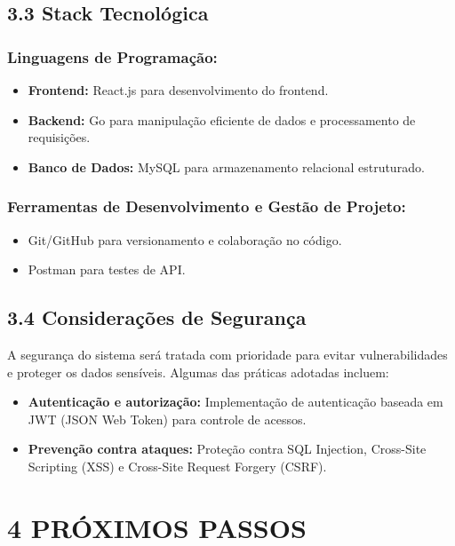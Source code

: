 \documentclass[12pt]{article}
\begin{document}
\subsection*{3.3 Stack Tecnológica}

\subsubsection*{Linguagens de Programação:}
\begin{itemize}
    \item \textbf{Frontend:} React.js para desenvolvimento do frontend.
    \item \textbf{Backend:} Go para manipulação eficiente de dados e processamento de requisições.
    \item \textbf{Banco de Dados:} MySQL para armazenamento relacional estruturado.
\end{itemize}

\subsubsection*{Ferramentas de Desenvolvimento e Gestão de Projeto:}
\begin{itemize}
    \item Git/GitHub para versionamento e colaboração no código.
    \item Postman para testes de API.
\end{itemize}

\subsection*{3.4 Considerações de Segurança}

A segurança do sistema será tratada com prioridade para evitar vulnerabilidades e proteger os dados sensíveis. Algumas das práticas adotadas incluem:
\begin{itemize}
    \item \textbf{Autenticação e autorização:} Implementação de autenticação baseada em JWT (JSON Web Token) para controle de acessos.
    \item \textbf{Prevenção contra ataques:} Proteção contra SQL Injection, Cross-Site Scripting (XSS) e Cross-Site Request Forgery (CSRF).
\end{itemize}

\newpage

\section*{4 PRÓXIMOS PASSOS}
\end{document}
